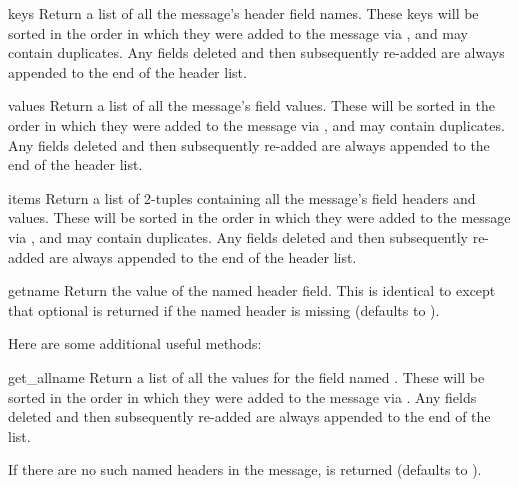\begin{methoddesc}[Message]{keys}{}
Return a list of all the message's header field names.  These keys
will be sorted in the order in which they were added to the message
via , and may contain duplicates.  Any fields
deleted and then subsequently re-added are always appended to the end
of the header list.
\end{methoddesc}

\begin{methoddesc}[Message]{values}{}
Return a list of all the message's field values.  These will be sorted
in the order in which they were added to the message via
, and may contain duplicates.  Any fields
deleted and then subsequently re-added are always appended to the end
of the header list.
\end{methoddesc}

\begin{methoddesc}[Message]{items}{}
Return a list of 2-tuples containing all the message's field headers and
values.  These will be sorted in the order in which they were added to
the message via , and may contain duplicates.
Any fields deleted and then subsequently re-added are always appended
to the end of the header list.
\end{methoddesc}

\begin{methoddesc}[Message]{get}{name}
Return the value of the named header field.  This is identical to
 except that optional  is returned
if the named header is missing (defaults to ).
\end{methoddesc}

Here are some additional useful methods:

\begin{methoddesc}[Message]{get_all}{name}
Return a list of all the values for the field named .  These
will be sorted in the order in which they were added to the message
via .  Any fields
deleted and then subsequently re-added are always appended to the end
of the list.

If there are no such named headers in the message,  is
returned (defaults to ).
\end{methoddesc}

